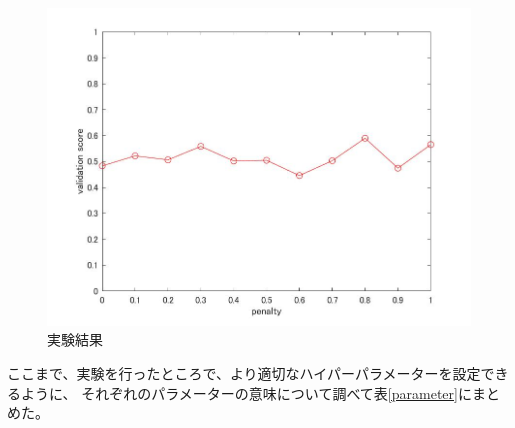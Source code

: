 \documentclass[a4j,11pt]{jarticle}
\begin{document}
\begin{figure}
	\begin{minipage}{0.50\hsize}
		\begin{center}
			\includegraphics[width=12cm, bb=0 0 875 656]{../matlab/fig/penalty.jpg}
		\end{center}
	\end{minipage}
	\begin{minipage}{0.50\hsize}
		\begin{center}
		\end{center}
	\end{minipage}
	\caption{実験結果} \label{result0}
\end{figure}


ここまで、実験を行ったところで、より適切なハイパーパラメーターを設定できるように、
それぞれのパラメーターの意味について調べて表\ref{parameter}にまとめた。
\end{document}
